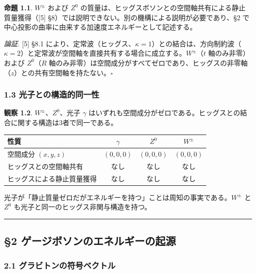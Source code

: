 \documentclass[
  a4paper,11pt]{ltjsarticle}
\newcounter{none}
\theoremstyle{definition}
\theoremstyle{remark}
\begin{document}
\textbf{命題 1.1}. \(W^{\pm}\) および \(Z^0\)
の質量は、ヒッグスボソンとの空間軸共有による静止質量獲得（{[}5{]}
§8）では説明できない。別の機構による説明が必要であり、§2
で中心投影の曲率に由来する加速度エネルギーとして記述する。

\emph{論証}. {[}5{]} §8.1
により、定常波（ヒッグス、\(\kappa = 1\)）との結合は、方向制約波（\(\kappa = 2\)）と定常波が空間軸を直接共有する場合に成立する。\(W^{\pm}\)（\(t\)
軸のみ非零）および \(Z^0\)（\(R\)
軸のみ非零）は空間成分がすべてゼロであり、ヒッグスの非零軸（\(z\)）との共有空間軸を持たない。\(\square\)

\subsubsection{1.3
光子との構造的同一性}\label{ux5149ux5b50ux3068ux306eux69cbux9020ux7684ux540cux4e00ux6027}

\textbf{観察 1.2}. \(W^{\pm}\)、\(Z^0\)、光子 \(\gamma\)
はいずれも空間成分がゼロである。ヒッグスとの結合に関する構造は3者で同一である。

{\def\LTcaptype{none} %
\begin{longtable}[]{@{}lccc@{}}
\toprule\noalign{}
性質 & \(\gamma\) & \(Z^0\) & \(W^{\pm}\) \\
\midrule\noalign{}
\endhead
\bottomrule\noalign{}
\endlastfoot
空間成分 \((x,y,z)\) & \((0,0,0)\) & \((0,0,0)\) & \((0,0,0)\) \\
ヒッグスとの空間軸共有 & なし & なし & なし \\
ヒッグスによる静止質量獲得 & なし & なし & なし \\
\end{longtable}
}

光子が「静止質量ゼロだがエネルギーを持つ」ことは周知の事実である。\(W^{\pm}\)
と \(Z^0\) も光子と同一のヒッグス非関与構造を持つ。

\begin{center}\rule{0.5\linewidth}{0.5pt}\end{center}

\subsection{§2
ゲージボソンのエネルギーの起源}\label{ux30b2ux30fcux30b8ux30dcux30bdux30f3ux306eux30a8ux30cdux30ebux30aeux30fcux306eux8d77ux6e90}

\subsubsection{2.1
グラビトンの符号ベクトル}\label{ux30b0ux30e9ux30d3ux30c8ux30f3ux306eux7b26ux53f7ux30d9ux30afux30c8ux30eb}
\end{document}
